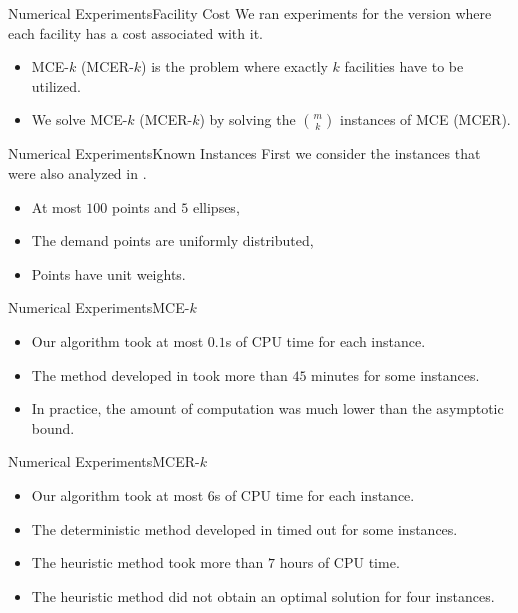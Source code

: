\documentclass{beamer}
\theoremstyle{definition}
\begin{document}
\begin{frame}{Numerical Experiments}{Facility Cost}
	We ran experiments for the version where each facility has a cost associated with it.
	\begin{itemize}
		\item MCE-$k$ (MCER-$k$) is the problem where exactly $k$ facilities have to be utilized.
		\item We solve MCE-$k$ (MCER-$k$) by solving the $\binom{m}{k}$ instances of MCE (MCER). 
	\end{itemize} 
\end{frame}

\begin{frame}{Numerical Experiments}{Known Instances}
	First we consider the instances that were also analyzed in \cite{andreta}.

	\begin{itemize}
		\item At most $100$ points and $5$ ellipses,
		\item The demand points are uniformly distributed,
		\item Points have unit weights.
	\end{itemize}	
	

\end{frame}

\begin{frame}{Numerical Experiments}{MCE-$k$}
	\begin{itemize}
		\item Our algorithm took at most $0.1$s of CPU time for each instance.
		\item The method developed in \cite{andreta} took more than $45$ minutes for some instances.
		\item In practice, the amount of computation was much lower than the asymptotic bound.
	\end{itemize}
\end{frame}

\begin{frame}{Numerical Experiments}{MCER-$k$}
	\begin{itemize}
	\item Our algorithm took at most $6$s of CPU time for each instance.
	\item The deterministic method developed in \cite{andreta} timed out for some instances.
	\item The heuristic method took more than $7$ hours of CPU time.
	\item The heuristic method did not obtain an optimal solution for four instances.
	\end{itemize}
\end{frame}
\end{document}
